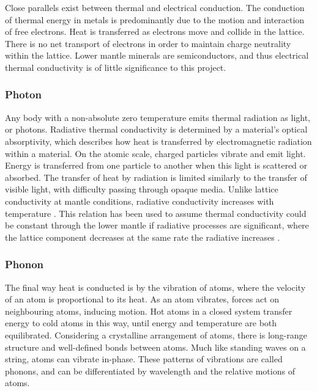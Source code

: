 Close parallels exist between thermal and electrical conduction. The conduction of thermal energy in metals is predominantly due to the motion and interaction of free electrons. Heat is transferred as electrons move and collide in the lattice. There is no net transport of electrons in order to maintain charge neutrality within the lattice. Lower mantle minerals are semiconductors, and thus electrical thermal conductivity is of little significance to this project.

\subsubsection{Photon}

Any body with a non-absolute zero temperature emits thermal radiation as light, or photons. Radiative thermal conductivity is determined by a material's optical absorptivity, which describes how heat is transferred by electromagnetic radiation within a material. On the atomic scale, charged particles vibrate and emit light. Energy is transferred from one particle to another when this light is scattered or absorbed. The transfer of heat by radiation is limited similarly to the transfer of visible light, with difficulty passing through opaque media. Unlike lattice conductivity at mantle conditions, radiative conductivity increases with temperature \citep{Hofmeister1999}. This relation has been used to assume thermal conductivity could be constant through the lower mantle if radiative processes are significant, where the lattice component decreases at the same rate the radiative increases \citep{Tang2014}.

\subsubsection{Phonon}

The final way heat is conducted is by the vibration of atoms, where the velocity of an atom is proportional to its heat. As an atom vibrates, forces act on neighbouring atoms, inducing motion. Hot atoms in a closed system transfer energy to cold atoms in this way, until energy and temperature are both equilibrated. Considering a crystalline arrangement of atoms, there is long-range structure and well-defined bonds between atoms. Much like standing waves on a string, atoms can vibrate in-phase. These patterns of vibrations are called phonons, and can be differentiated by wavelength and the relative motions of atoms.

